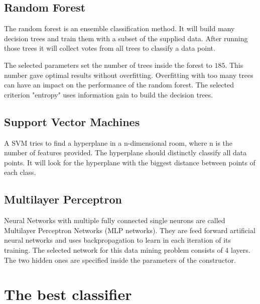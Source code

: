 \subsection{Random Forest}

The random forest is an ensemble classification method. It will build many decision trees and train them with a subset of the supplied data. After running those trees it will collect votes from all trees to classify a data point.

The selected parameters set the number of trees inside the forest to $185$. This number gave optimal results without overfitting. Overfitting with too many trees can have an impact on the performance of the random forest. The selected criterion "entropy" uses information gain to build the decision trees.



\subsection{Support Vector Machines}

A SVM tries to find a hyperplane in a n-dimensional room, where n is the number of features provided. The hyperplane should distinctly classify all data points. It will look for the hyperplane with the biggest distance between points of each class.



\subsection{Multilayer Perceptron}

Neural Networks with multiple fully connected single neurons are called Multilayer Perceptron Networks (MLP networks). They are feed forward artificial neural networks and uses backpropagation to learn in each iteration of its training. The selected network for this data mining problem consists of 4 layers. The two hidden ones are specified inside the parameters of the constructor.



\section{The best classifier}

